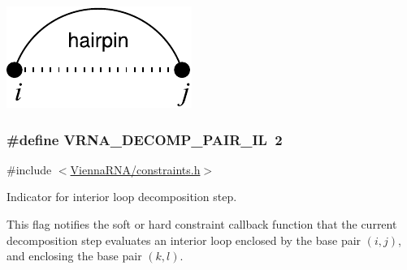  
\begin{DoxyImageNoCaption}
  \mbox{\includegraphics[width=\textwidth,height=\textheight/2,keepaspectratio=true]{decomp_hp}}
\end{DoxyImageNoCaption}
 \hypertarget{group__constraints_gaeab04f34d7730cff2d651d782f95d857}{}
\subsubsection[{V\+R\+N\+A\+\_\+\+D\+E\+C\+O\+M\+P\+\_\+\+P\+A\+I\+R\+\_\+\+I\+L}]{\setlength{\rightskip}{0pt plus 5cm}\#define V\+R\+N\+A\+\_\+\+D\+E\+C\+O\+M\+P\+\_\+\+P\+A\+I\+R\+\_\+\+I\+L~2}\label{group__constraints_gaeab04f34d7730cff2d651d782f95d857}


{\ttfamily \#include $<$\hyperlink{constraints_8h}{Vienna\+R\+N\+A/constraints.\+h}$>$}



Indicator for interior loop decomposition step. 

This flag notifies the soft or hard constraint callback function that the current decomposition step evaluates an interior loop enclosed by the base pair $(i,j)$, and enclosing the base pair $(k,l)$.

